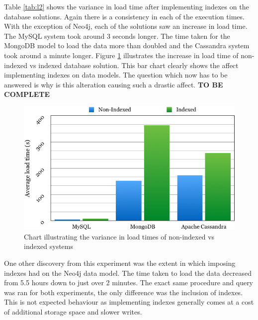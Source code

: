 Table \ref{tab:l2} shows the variance in load time after implementing indexes on the database solutions. Again there is a consistency in each of the execution times. With the exception of Neo4j, each of the solutions saw an increase in load time. The MySQL system took around 3 seconds longer. The time taken for the MongoDB model to load the data more than doubled and the Cassandra system took around a minute longer. Figure \ref{fig:nonvsin} illustrates the increase in load time of non-indexed vs indexed database solution. This bar chart clearly shows the affect implementing indexes on data models. The question which now has to be answered is why is this alteration causing such a drastic affect. \textbf{TO BE COMPLETE} \begin{figure}[H]\begin{center}\includegraphics[width=1\linewidth]{images/nonvsin}\caption{Chart illustrating the variance in load times of non-indexed vs indexed systems}\label{fig:nonvsin}\end{center}\end{figure}

One other discovery from this experiment was the extent in which imposing indexes had on the Neo4j data model. The time taken to load the data decreased from 5.5 hours down to just over 2 minutes. The exact same procedure and query was ran for both experiments, the only difference was the inclusion of indexes. This is not expected behaviour as implementing indexes generally comes at a cost of additional storage space and slower writes.

